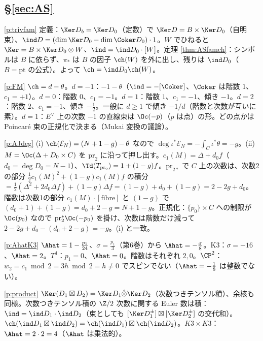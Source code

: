 \subsection*{\S\ref{sec:AS}}
\begin{sol}{\ref{p:trivfam}}
定義：$\Ker D_b=\Ker D_0$（定数）で $\Ker D=B\times\Ker D_0$（自明束）、$\ind D=(\dim\Ker D_0-\dim\Coker D_0)\cdot1$。$W$ でひねると $\Ker=B\times\Ker D_0\otimes W$、$\ind=\ind D_0\cdot[W]$。定理 \ref{thm:ASfamch}：シンボルは $B$ に依らず、$\pi_*$ は $B$ の因子 $\ch(W)$ を外に出し、残りは $\ind D_0$（$B=\mathrm{pt}$ の公式）。よって $\ch=\ind D_0\ch(W)$。
\end{sol}
\begin{sol}{\ref{p:FM}}
$\ch=d-\theta$。$d=-1$：$-1-\theta$（$\ind=-[\Coker]$、$\Coker$ は階数 $1$、$c_1=+1$）。$d=0$：階数 $0$、$c_1=-1$。$d=1$：階数 $1$、$c_1=-1$、傾き $-1$。$d=2$：階数 $2$、$c_1=-1$、傾き $-\frac12$。一般に $d\ge1$ で傾き $-1/d$（階数と次数が互いに素）。$d=1$：$E^\vee$ 上の次数 $-1$ の直線束は $\Oc(-p)$（$p$ は点）の形。どの点かは Poincaré 束の正規化で決まる（Mukai 変換の議論\tQ）。
\end{sol}
\begin{sol}{\ref{p:AJdeg}}
(i) $\ch(\mathcal E_N)=(N+1-g)-\theta$ なので $\deg\iota^*\mathcal E_N=-\int_C\iota^*\theta=-g$。(ii) $M=\Oc(\Delta+D_0\times C)$ を $\mathrm{pr}_2$ に沿って押し出す。$c_1(M)=\Delta+d_0f$（$d_0=\deg D_0=N-1$）、$\Td(T_{\mathrm{pr}_2})=1+(1-g)f$。$\mathrm{pr}_{2*}$ で $C$ 上の次数は、次数2の部分 $\frac12c_1(M)^2+(1-g)c_1(M)f$ の積分 $=\frac12(\Delta^2+2d_0\Delta f)+(1-g)\Delta f=(1-g)+d_0+(1-g)=2-2g+d_0$。階数は次数1の部分 $c_1(M)\cdot[\mathrm{fibre}]$ と $(1-g)$ で $(d_0+1)+(1-g)=d_0+2-g=N+1-g$。正規化：$\{p_0\}\times C$ への制限が $\Oc(p_0)$ なので $\mathrm{pr}_2^*\Oc(-p_0)$ を掛け、次数は階数だけ減って $2-2g+d_0-(d_0+2-g)=-g$。(i) と一致。
\end{sol}
\begin{sol}{\ref{p:AhatK3}}
$\Ahat=1-\frac{p_1}{24}$、$\sigma=\frac{p_1}3$（第6巻）から $\Ahat=-\frac{\sigma}8$。K3：$\sigma=-16$、$\Ahat=2$。$T^4$：$p_1=0$、$\Ahat=0$。階数はそれぞれ $2,0$。$\CP^2$：$w_2=c_1\bmod2=3h\bmod2=h\ne0$ でスピンでない（$\Ahat=-\frac{1}{8}$ は整数でない）。
\end{sol}
\begin{sol}{\ref{p:product}}
$\Ker(D_1\boxtimes D_2)=\Ker D_1\hat\otimes\Ker D_2$（次数つきテンソル積）、余核も同様。次数つきテンソル積の $\Z/2$ 次数に関する Euler 数は積：$\ind=\ind D_1\cdot\ind D_2$（束としても $[\Ker D_1^\pm]\boxtimes[\Ker D_2^\pm]$ の交代和）。$\ch(\ind D_1\boxtimes\ind D_2)=\ch(\ind D_1)\boxtimes\ch(\ind D_2)$。$K3\times K3$：$\Ahat=2\cdot2=4$（$\Ahat$ は乗法的）。
\end{sol}
